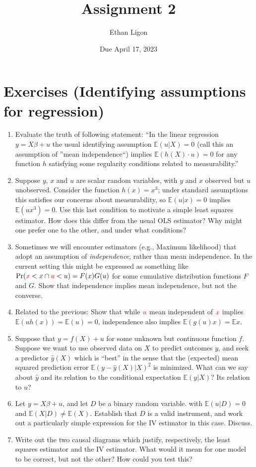 \documentclass[12pt]{amsart}
\author{Ethan Ligon}
\date{Due April 17, 2023}
\title{Assignment 2}
\newcommand{\rv}[1]{\ensuremath{\textcolor{red}{#1}{}}}
\newcommand{\rvx}{\rv{x}}
\newcommand{\rvu}{\rv{u}}
\renewcommand{\E}{\ensuremath{\mathds{E}}}
\begin{document}
\maketitle
\section{Exercises (Identifying assumptions for regression)}
\label{sec:org4cbc2b7}

\begin{enumerate}
\item Evaluate the truth of following statement: ``In the linear regression \(y=X\beta + u\) the usual identifying assumption \(\E(u|X)=0\) (call this an assumption of ''mean independence``) implies \(\E(h(X)\cdot u)=0\) for any function \(h\) satisfying some regularity conditions related to measurability.''

\item Suppose \(y\), \(x\) and \(u\) are scalar random variables, with \(y\) and \(x\) observed but \(u\) unobserved.  Consider the function \(h(x)=x^3\); under standard assumptions this satisfies our concerns about measurability, so \(\E(u|x)=0\) implies \(\E(ux^3)=0\).   Use this last condition to motivate a simple least squares estimator.  How does this differ from the usual OLS estimator?  Why might one prefer one to the other, and under what conditions?

\item Sometimes we will encounter estimators (e.g., Maximum likelihood) that adopt an assumption of \emph{independence}, rather than mean independence.  In the current setting this might be expressed as something like \(\mbox{Pr}(\rvx<x \cap \rvu<u)=F(x)G(u)\) for some cumulative distribution functions \(F\) and \(G\).  Show that independence implies mean independence, but not the converse.

\item Related to the previous: Show that while \(\rvu\) mean independent of \(\rvx\) implies \(\E(uh(x))=\E(u)=0\), independence also implies \(\E(g(u)x)=\E x\).

\item Suppose that \(y=f(X)+u\) for some unknown but continuous function \(f\).  Suppose we want to use observed data on \(X\) to predict outcomes \(y\), and seek a predictor \(\hat{y}(X)\) which is ``best'' in the sense that the (expected) mean squared prediction error \(\E (y-\hat{y}(X)|X)^2\) is minimized.  What can we say about \(\hat{y}\) and its relation to the conditional expectation \(\E(y|X)\)?  Its relation to \(u\)?

\item Let \(y = X\beta + u\), and let \(D\) be a binary random variable. with \(\E(u|D)=0\) and \(\E(X|D)\neq\E(X)\).  Establish that \(D\) is a valid instrument, and work out a particularly simple expression for the IV estimator in this case.  Discuss.

\item Write out the two causal diagrams which justify, respectively, the least squares estimator and the IV estimator.  What would it mean for one model to be correct, but not the other?  How could you test this?
\end{enumerate}
\end{document}

